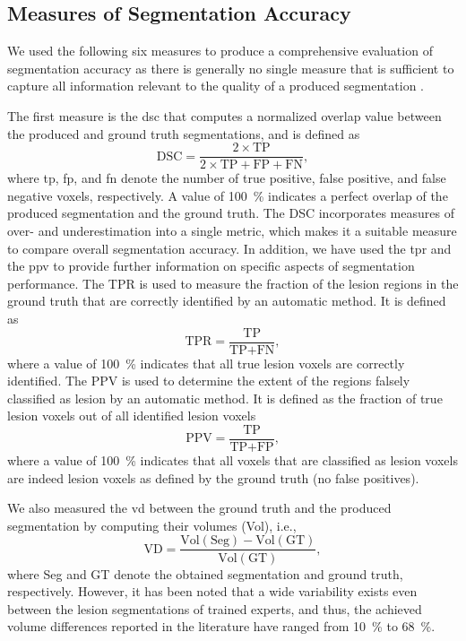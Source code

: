 \subsection[Measures of segmentation accuracy]{Measures of Segmentation
Accuracy}
 
We used the following six measures to produce a comprehensive evaluation
of segmentation accuracy as there is generally no single measure that is
sufficient to capture all information relevant to the quality of a produced
segmentation \citep{garcia2013}.

The first measure is the \gls{dsc}
\citep{dice1945measures} that computes a normalized overlap value between the
produced and ground truth segmentations, and is defined as
\begin{equation}
\text{DSC} = \frac{2 \times \text{TP}}{2 \times \text{TP} + \text{FP} +
\text{FN}},
\end{equation}
%
where \gls{tp}, \gls{fp}, and \gls{fn} denote the number of true positive, false
positive, and false negative voxels, respectively. A value of \SI{100}{\percent}
indicates a perfect overlap of the produced segmentation and the ground truth.
The DSC incorporates measures of over- and underestimation into a single metric,
which makes it a suitable measure to compare overall segmentation accuracy. In
addition, we have used the \gls{tpr} and the \gls{ppv} to provide further
information on specific aspects of segmentation performance. The TPR is used to measure the fraction of the lesion regions in
the ground truth that are correctly identified by an automatic method. It is
defined as
\begin{equation}
\text{TPR} = \frac{\text{TP}}{\text{TP} + \text{FN}},
\end{equation}
where a value of \SI{100}{\percent} indicates that all true lesion voxels are
correctly identified. The PPV is used to determine the extent of
the regions falsely classified as lesion by an automatic method.
It is defined as the fraction of true lesion voxels out of all
identified lesion voxels
\begin{equation}
\text{PPV} = \frac{\text{TP}}{\text{TP} + \text{FP}},
\end{equation}
where a value of \SI{100}{\percent} indicates that all voxels that are
classified as lesion voxels are indeed lesion voxels as defined by the ground
truth (no false positives).

We also measured the \gls{vd} between the ground truth and the produced
segmentation by computing their volumes (Vol), i.e.,
\begin{equation}
\text{VD} = \frac{\text{Vol}(\text{Seg}) - \text{Vol}(\text{GT})}
                {\text{Vol}(\text{GT})},
\end{equation}
where Seg and GT denote the obtained segmentation and ground truth,
respectively. However, it has been noted \citep{garcia2013} that a wide
variability exists even between the lesion segmentations of trained experts, and
thus, the achieved volume differences reported in the literature have ranged
from \SI{10}{\percent} to \SI{68}{\percent}.

